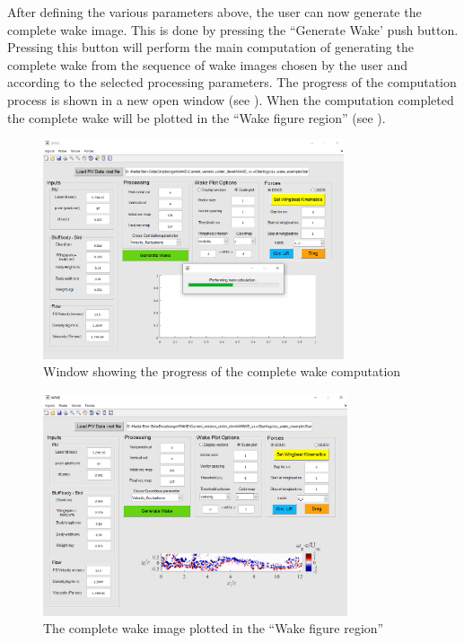 \documentclass[12pt,a4paper]{article}
\begin{document}
  After defining the various parameters above, the user can now generate the complete wake image. This is done by pressing the ``Generate Wake' push button. Pressing this button will perform the main computation of generating the complete wake from the sequence of wake images chosen by the user and according to the selected processing parameters. The progress of the computation process is shown in a new open window (see ). When the computation completed the complete wake will be plotted in the ``Wake figure region'' (see ).  
  
\begin{figure}[ht!]
	\centering
	\includegraphics[width=0.79\textwidth]{Generating_Wake_processing}
	\caption{Window showing the progress of the complete wake computation}
	\label{fig:GUI-generating-wake-progress}
\end{figure}
  
\begin{figure}[ht!]
	\centering
	\includegraphics[width=0.8\textwidth]{wake-generated}
	\caption{The complete wake image plotted in the ``Wake figure region''}
	\label{fig:GUI-wake-generated}
\end{figure}
 
\end{document}
